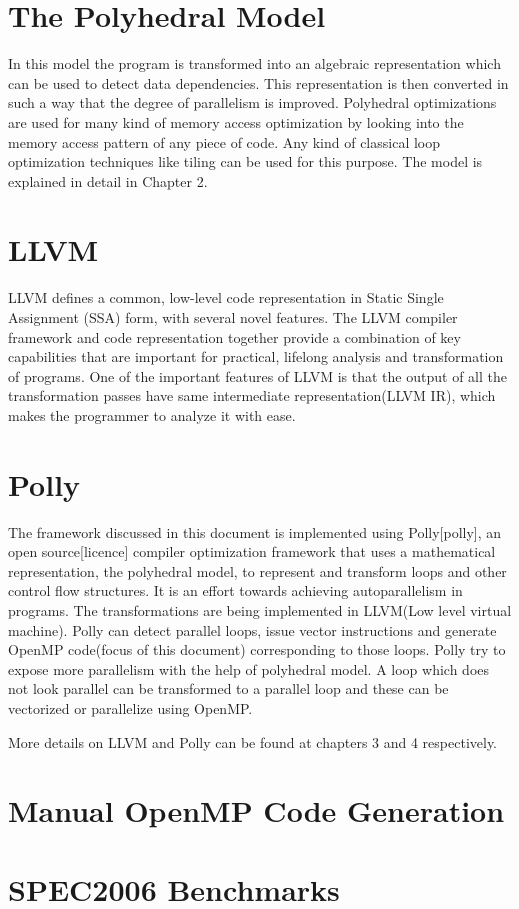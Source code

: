\documentclass[a4paper,12pt]{book}
\begin{document}
\section{The Polyhedral Model}

In this model the program is transformed into an algebraic representation which can be used to
detect data dependencies. This representation is then converted in such a way that the degree
of parallelism is improved. Polyhedral optimizations are used for many kind of memory access optimization by
looking into the memory access pattern of any piece of code. Any kind of classical
 loop optimization techniques like tiling can be used for this purpose. The model is
explained in detail in Chapter 2.

\section{LLVM}
LLVM defines a common, low-level code representation in Static Single Assignment
(SSA) form, with several novel features. The LLVM compiler framework and code
representation together provide a combination of key capabilities that are
important for practical, lifelong analysis and transformation of programs.
One of the important features of LLVM is that the output of all the
transformation passes have same intermediate representation(LLVM IR), which
makes the programmer to analyze it with ease.

\section{Polly}
The framework discussed in this document is implemented using Polly[polly],
an open source[licence] compiler  optimization framework that uses a mathematical
 representation, the polyhedral model, to represent and transform loops and other
 control flow structures. It is an effort towards achieving autoparallelism in programs.
 The transformations are being implemented in LLVM(Low level virtual machine). 
Polly can detect parallel loops, issue vector instructions and generate OpenMP code(focus of 
this document) corresponding to those loops. Polly try to expose more parallelism
with the help of polyhedral model. A loop which does not look parallel can be transformed
to a parallel loop and these can be vectorized or parallelize using OpenMP.

More details on LLVM and Polly can be found at chapters 3 and 4 respectively.

\section{Manual OpenMP Code Generation}

\section{SPEC2006 Benchmarks}
\end{document}
